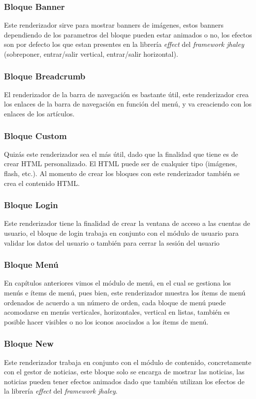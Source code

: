 \subsubsection{Bloque Banner}
Este renderizador sirve para mostrar banners de im\'agenes, estos banners dependiendo de los parametros del bloque pueden estar animados o no, los efectos son por defecto los que estan presentes en la librer\'ia \textit{effect} del \textit{framework jhaley} (sobreponer, entrar/salir vertical, entrar/salir horizontal).

\subsubsection{Bloque Breadcrumb}
El renderizador de la barra de navegaci\'on es bastante \'util, este renderizador crea los enlaces de la barra de navegaci\'on en funci\'on del men\'u, y va creaciendo con los enlaces de los art\'iculos.

\subsubsection{Bloque Custom}
Quiz\'as este renderizador sea el m\'as \'util, dado que la finalidad que tiene es de crear HTML personalizado. El HTML puede ser de cualquier tipo (im\'agenes, flash, etc.). Al momento de crear los bloques con este renderizador tambi\'en se crea el contenido HTML.

\subsubsection{Bloque Login}
Este renderizador tiene la finalidad de crear la ventana de acceso a las cuentas de usuario, el bloque de login trabaja en conjunto con el m\'odulo de usuario para validar los datos del usuario o tambi\'en para cerrar la sesi\'on del usuario

\subsubsection{Bloque Men\'u}
En cap\'itulos anteriores vimos el m\'odulo de men\'u, en el cual se gestiona los men\'us e \'items de men\'u, pues bien, este renderizador muestra los \'items de men\'u ordenados de acuerdo a un n\'umero de orden, cada bloque de men\'u puede acomodarse en men\'us verticales, horizontales, vertical en listas, tambi\'en es posible hacer visibles o no los iconos asociados a los \'items de men\'u.

\subsubsection{Bloque New}
Este renderizador trabaja en conjunto con el m\'odulo de contenido, concretamente con el gestor de noticias, este bloque solo se encarga de mostrar las noticias, las noticias pueden tener efectos animados dado que tambi\'en utilizan los efectos de la librer\'ia \textit{effect} del \textit{framework jhaley}.

